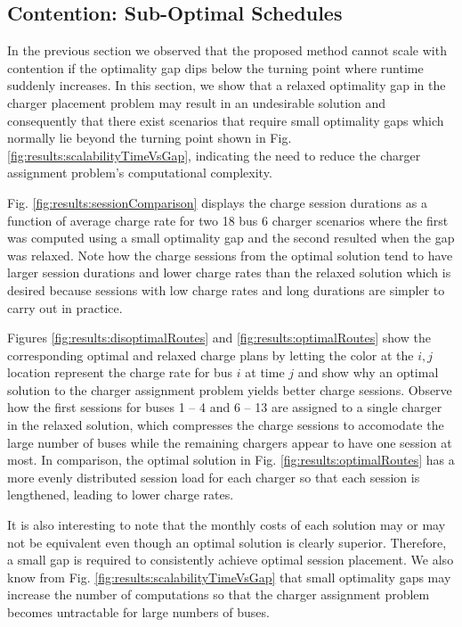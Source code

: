 \subsection{Contention: Sub-Optimal Schedules}
In the previous section we observed that the proposed method cannot scale with contention if the optimality gap dips below the turning point where runtime suddenly increases. In this section, we show that a relaxed optimality gap in the charger placement problem may result in an undesirable solution and consequently that there exist scenarios that require small optimality gaps which normally lie beyond the turning point shown in Fig. \ref{fig:results:scalabilityTimeVsGap}, indicating the need to reduce the charger assignment problem's computational complexity. 
\par Fig. \ref{fig:results:sessionComparison} displays the charge session durations as a function of average charge rate for two 18 bus 6 charger scenarios where the first was computed using a small optimality gap and the second resulted when the gap was relaxed. Note how the charge sessions from the optimal solution tend to have larger session durations and lower charge rates than the relaxed solution which is desired because sessions with low charge rates and long durations are simpler to carry out in practice. 
\par Figures \ref{fig:results:disoptimalRoutes} and \ref{fig:results:optimalRoutes} show the corresponding optimal and relaxed charge plans by letting the color at the $i,j$ location represent the charge rate for bus $i$ at time $j$ and show why an optimal solution to the charger assignment problem yields better charge sessions. Observe how the first sessions for buses 1 -- 4 and 6 -- 13 are assigned to a single charger in the relaxed solution, which compresses the charge sessions to accomodate the large number of buses while the remaining chargers appear to have one session at most. In comparison, the optimal solution in Fig. \ref{fig:results:optimalRoutes} has a more evenly distributed session load for each charger so that each session is lengthened, leading to lower charge rates. 
\par It is also interesting to note that the monthly costs of each solution may or may not be equivalent even though an optimal solution is clearly superior. Therefore, a small gap is required to consistently achieve optimal session placement. We also know from Fig. \ref{fig:results:scalabilityTimeVsGap} that small optimality gaps may increase the number of computations so that the charger assignment problem becomes untractable for large numbers of buses.  

 

